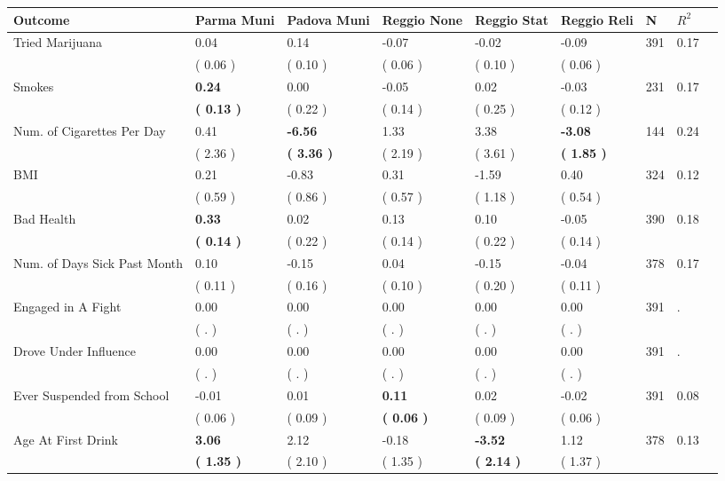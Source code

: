 \begin{tabular}{L{6.2cm} C{1.8cm} C{1.8cm} C{1.8cm} C{1.8cm} C{1.8cm} C{1.8cm} C{0.3cm} C{0.3cm}}
\toprule
 \textbf{Outcome} & \textbf{Parma Muni} & \textbf{Padova Muni} & \textbf{Reggio None} & \textbf{Reggio Stat} & \textbf{Reggio Reli} & \textbf{N} & \textbf{$ R^2$} \\
\midrule
Tried Marijuana &      0.04 &      0.14 &     -0.07 &     -0.02 &     -0.09  & 391 &       0.17 \\ 
 & (     0.06 ) & (     0.10 ) & (     0.06 ) & (     0.10 ) & (     0.06 )  & \\
Smokes & \textbf{     0.24} &      0.00 &     -0.05 &      0.02 &     -0.03  & 231 &       0.17 \\ 
 & \textbf{(     0.13 )} & (     0.22 ) & (     0.14 ) & (     0.25 ) & (     0.12 )  & \\
Num. of Cigarettes Per Day &      0.41 & \textbf{    -6.56} &      1.33 &      3.38 & \textbf{    -3.08}  & 144 &       0.24 \\ 
 & (     2.36 ) & \textbf{(     3.36 )} & (     2.19 ) & (     3.61 ) & \textbf{(     1.85 )}  & \\
BMI &      0.21 &     -0.83 &      0.31 &     -1.59 &      0.40  & 324 &       0.12 \\ 
 & (     0.59 ) & (     0.86 ) & (     0.57 ) & (     1.18 ) & (     0.54 )  & \\
Bad Health & \textbf{     0.33} &      0.02 &      0.13 &      0.10 &     -0.05  & 390 &       0.18 \\ 
 & \textbf{(     0.14 )} & (     0.22 ) & (     0.14 ) & (     0.22 ) & (     0.14 )  & \\
Num. of Days Sick Past Month &      0.10 &     -0.15 &      0.04 &     -0.15 &     -0.04  & 378 &       0.17 \\ 
 & (     0.11 ) & (     0.16 ) & (     0.10 ) & (     0.20 ) & (     0.11 )  & \\
Engaged in A Fight &      0.00 &      0.00 &      0.00 &      0.00 &      0.00  & 391 &          . \\ 
 & (        . ) & (        . ) & (        . ) & (        . ) & (        . )  & \\
Drove Under Influence &      0.00 &      0.00 &      0.00 &      0.00 &      0.00  & 391 &          . \\ 
 & (        . ) & (        . ) & (        . ) & (        . ) & (        . )  & \\
Ever Suspended from School &     -0.01 &      0.01 & \textbf{     0.11} &      0.02 &     -0.02  & 391 &       0.08 \\ 
 & (     0.06 ) & (     0.09 ) & \textbf{(     0.06 )} & (     0.09 ) & (     0.06 )  & \\
Age At First Drink & \textbf{     3.06} &      2.12 &     -0.18 & \textbf{    -3.52} &      1.12  & 378 &       0.13 \\ 
 & \textbf{(     1.35 )} & (     2.10 ) & (     1.35 ) & \textbf{(     2.14 )} & (     1.37 )  & \\
\bottomrule
\end{tabular}
